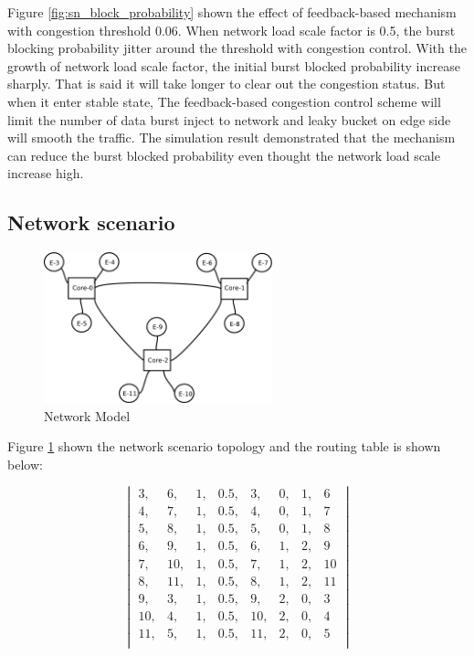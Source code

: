 Figure \ref{fig:sn_block_probability} shown the effect of feedback-based mechanism with congestion threshold 0.06. When network load scale factor is 0.5, the burst blocking probability jitter around the threshold with congestion control. With the growth of network load scale factor, the initial burst blocked probability increase sharply. That is said it will take longer to clear out the congestion status. But when it enter stable state, The feedback-based congestion control
scheme will limit the number of data burst inject to network and leaky bucket on edge side will smooth the traffic. The simulation result demonstrated that the mechanism can reduce the burst blocked probability even thought the network load scale increase high.

\subsection{Network scenario}

\begin{figure}[!htb]
\centering
\includegraphics[width=2.6in]{fig/network_topo}
\caption{Network Model}
\label{fig:network_topo}
\end{figure}


Figure \ref{fig:network_topo} shown the network scenario topology and the routing table is shown below:

$$\begin{vmatrix}  
 3, & 6, & 1, & 0.5, & 3, & 0, & 1, & 6 \\  
 4, & 7, & 1, & 0.5, & 4, & 0, & 1, & 7 \\  
 5, & 8, & 1, & 0.5, & 5, & 0, & 1, & 8 \\  
 6, & 9, & 1, & 0.5, & 6, & 1, & 2, & 9 \\  
 7, & 10, & 1, & 0.5, & 7, & 1, & 2, & 10 \\  
 8, & 11, & 1, & 0.5, & 8, & 1, & 2, & 11 \\  
 9, & 3, & 1, & 0.5, & 9, & 2, & 0, & 3 \\  
 10, & 4, & 1, & 0.5, & 10, & 2, & 0, & 4 \\  
 11, & 5, & 1, & 0.5, & 11, & 2, & 0, & 5 \\  
\end{vmatrix}$$

